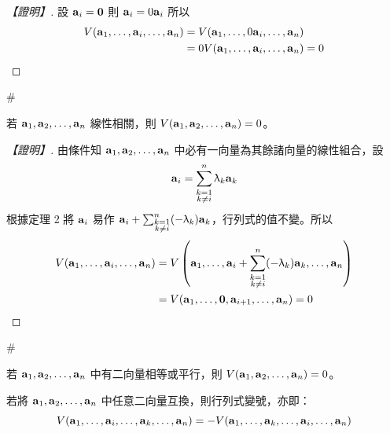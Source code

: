 \begin{proof}[【證明】]
設 $\vect{a}_i = \vect{0}$ 則 $\vect{a}_i = 0\vect{a}_i$ 所以
\begin{align*}
V(\vect{a}_1, \dots, \vect{a}_i, \dots, \vect{a}_n) &= V(\vect{a}_1, \dots, 0\vect{a}_i, \dots, \vect{a}_n) \\
&= 0 V(\vect{a}_1, \dots, \vect{a}_i, \dots, \vect{a}_n) = 0
\end{align*}
\end{proof}\hfill$\#$

\begin{theorem}\label{thm:b6s-1-5}
若 $\vect{a}_1, \vect{a}_2, \dots, \vect{a}_n$ 線性相關，則 $V(\vect{a}_1, \vect{a}_2, \dots, \vect{a}_n) = 0$。
\end{theorem}

\begin{proof}[【證明】]
由條件知 $\vect{a}_1, \vect{a}_2, \dots, \vect{a}_n$ 中必有一向量為其餘諸向量的線性組合，設
\begin{equation}
\vect{a}_i = \sum_{\substack{k=1\\ k\ne i}}^n \lambda_k \vect{a}_k \label{eq:b6s-1-4-1}
\end{equation}
根據定理 2 將 $\vect{a}_i$ 易作 $\vect{a}_i + \sum_{\substack{k=1\\ k\ne i}}^n (-\lambda_k)\vect{a}_k$，行列式的值不變。所以
\begin{align*}
V(\vect{a}_1, \dots, \vect{a}_i, \dots, \vect{a}_n) &= V\left(\vect{a}_1, \dots, \vect{a}_i + \sum_{\substack{k=1\\ k\ne i}}^n (-\lambda_k)\vect{a}_k, \dots, \vect{a}_n\right) \\
&= V(\vect{a}_1, \dots, \vect{0}, \vect{a}_{i+1}, \dots, \vect{a}_n) = 0
\end{align*}
\end{proof}\hfill$\#$

\begin{corollary}\label{cor:b6s-1-1}
若 $\vect{a}_1, \vect{a}_2, \dots, \vect{a}_n$ 中有二向量相等或平行，則 $V(\vect{a}_1, \vect{a}_2, \dots, \vect{a}_n) = 0$。
\end{corollary}

\begin{theorem}\label{thm:b6s-1-6}
若將 $\vect{a}_1, \vect{a}_2, \dots, \vect{a}_n$ 中任意二向量互換，則行列式變號，亦即：
\[ V(\vect{a}_1, \dots, \vect{a}_i, \dots, \vect{a}_k, \dots, \vect{a}_n) = -V(\vect{a}_1, \dots, \vect{a}_k, \dots, \vect{a}_i, \dots, \vect{a}_n) \]
\end{theorem}

